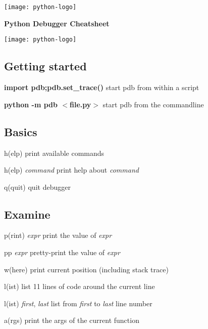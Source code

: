 \documentclass[10pt,landscape,a4paper]{article}
\newcommand{\keystroke}[1]{$<$#1$>$}
\begin{document}
  \begin{center}
    \begin{minipage}[c]{0.15\textwidth}
      \texttt{[image: python-logo]}
    \end{minipage}
    \begin{minipage}[c]{0.43\textwidth}
      \huge \bfseries Python Debugger Cheatsheet
    \end{minipage}
    \begin{minipage}[r]{0.15\textwidth}
      \texttt{[image: python-logo]}
    \end{minipage}
    \vspace{1cm}
  \end{center}

  \begin{multicols}{2}
    \subsection{Getting started}
      \begin{eqlist}
        \item[{\bfseries import pdb;pdb.set\_trace()}] start pdb from within a script
        \item[{\bfseries python -m pdb \keystroke{file.py}}] start pdb from the commandline
      \end{eqlist}

    \subsection{Basics}
      \begin{eqlist}
        \item[h(elp)] print available commands
        \item[h(elp) \textit{command}] print help about \textit{command}
        \item[q(quit)] quit debugger
      \end{eqlist}

    \subsection{Examine}
      \begin{eqlist}
        \item[p(rint) \textit{expr}] print the value of \textit{expr}
        \item[pp \textit{expr}] pretty-print the value of \textit{expr}
        \item[w(here)] print current position (including stack trace)
        \item[l(ist)] list 11 lines of code around the current line
        \item[l(ist) \textit{first}, \textit{last}] list from \textit{first} to \textit{last} line number
        \item[a(rgs)] print the args of the current function
      \end{eqlist}


\end{multicols}
\end{document}
